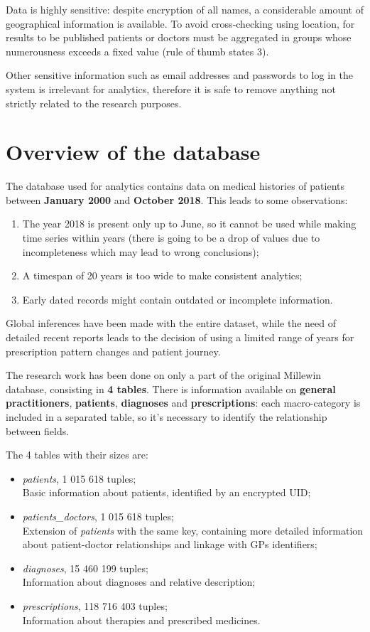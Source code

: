 Data is highly sensitive: despite encryption of all names, a considerable amount of geographical information is available. To avoid cross-checking using location, for results to be published patients or doctors must be aggregated in groups whose numerousness exceeds a fixed value (rule of thumb states 3). 

Other sensitive information such as email addresses and passwords to log in the system is irrelevant for analytics, therefore it is safe to remove anything not strictly related to the research purposes.

\section{Overview of the database}
The database used for analytics contains data on medical histories of patients between \textbf{January 2000} and \textbf{October 2018}. This leads to some observations:
\begin{enumerate}
	\item The year 2018 is present only up to June, so it cannot be used while making time series within years (there is going to be a drop of values due to incompleteness which may lead to wrong conclusions);
	\item A timespan of 20 years is too wide to make consistent analytics;
	\item Early dated records might contain outdated or incomplete information.
\end{enumerate}

Global inferences have been made with the entire dataset, while the need of detailed recent reports leads to the decision of using a limited range of years for prescription pattern changes and patient journey.

The research work has been done on only a part of the original Millewin database, consisting in \textbf{4 tables}. There is information available on \textbf{general practitioners}, \textbf{patients}, \textbf{diagnoses} and \textbf{prescriptions}: each macro-category is included in a separated table, so it's necessary to identify the relationship between fields.

The 4 tables with their sizes are:
\begin{itemize}
	\item \textit{patients}, 1 015 618 tuples; \\
	Basic information about patients, identified by an encrypted UID;
	\item \textit{patients\_doctors}, 1 015 618 tuples; \\
	Extension of \textit{patients} with the same key, containing more detailed information about patient-doctor relationships and linkage with GPs identifiers;
	\item \textit{diagnoses}, 15 460 199 tuples; \\
	Information about diagnoses and relative description;
	\item \textit{prescriptions}, 118 716 403 tuples; \\
	Information about therapies and prescribed medicines.
\end{itemize}


